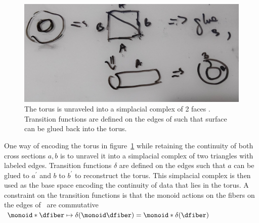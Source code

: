 \documentclass[../main.tex]{subfiles}
\begin{document}
\begin{figure}[H]
    \includegraphics[width=\textwidth]{figures/math/triangle_torus.png}
    \caption{The torus \dtotal is unraveled into a simplacial complex of 2 faces \dbase. Transition functions are defined on the edges of \dbase such that surface can be glued back into the torus.
    }
    \label{fig:triangle_torus}
\end{figure}
One way of encoding the torus in figure~\ref{fig:triangle_torus} while retaining the continuity of both cross sections $a, b$ is to unravel it into a simplacial complex of two triangles with labeled edges. Transition functions $\delta$ are defined on the edges such that $a$ can be glued to $a^\prime$ and $b$ to $b^\prime$ to reconstruct the torus. This simplacial complex is then used as the base space encoding the continuity of data that lies in the torus. A constraint on the transition functions is that the monoid actions on the fibers on the edges of \dtotal\ are commutative $\monoid*\dfiber\mapsto \delta(\monoid\dfiber)= \monoid*\delta(\dfiber)$
\end{document}
